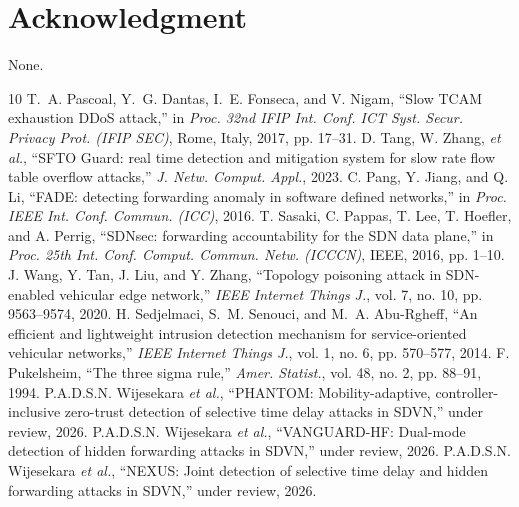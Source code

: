 \documentclass[lettersize,journal]{IEEEtran}
\begin{document}
\section*{Acknowledgment}
None.

\balance
\begin{thebibliography}{10}
\footnotesize
\setlength{\itemsep}{0pt}
\setlength{\parsep}{0pt}
\setlength{\parskip}{0pt}
 T.~A. Pascoal, Y.~G. Dantas, I.~E. Fonseca, and V. Nigam, ``Slow TCAM exhaustion DDoS attack,'' in \textit{Proc. 32nd IFIP Int. Conf. ICT Syst. Secur. Privacy Prot. (IFIP SEC)}, Rome, Italy, 2017, pp. 17--31.
 D. Tang, W. Zhang, \textit{et al.}, ``SFTO Guard: real time detection and mitigation system for slow rate flow table overflow attacks,'' \textit{J. Netw. Comput. Appl.}, 2023.
 C. Pang, Y. Jiang, and Q. Li, ``FADE: detecting forwarding anomaly in software defined networks,'' in \textit{Proc. IEEE Int. Conf. Commun. (ICC)}, 2016.
 T. Sasaki, C. Pappas, T. Lee, T. Hoefler, and A. Perrig, ``SDNsec: forwarding accountability for the SDN data plane,'' in \textit{Proc. 25th Int. Conf. Comput. Commun. Netw. (ICCCN)}, IEEE, 2016, pp. 1--10.
 J. Wang, Y. Tan, J. Liu, and Y. Zhang, ``Topology poisoning attack in SDN-enabled vehicular edge network,'' \textit{IEEE Internet Things J.}, vol. 7, no. 10, pp. 9563--9574, 2020.
 H. Sedjelmaci, S.~M. Senouci, and M.~A. Abu-Rgheff, ``An efficient and lightweight intrusion detection mechanism for service-oriented vehicular networks,'' \textit{IEEE Internet Things J.}, vol. 1, no. 6, pp. 570--577, 2014.
 F. Pukelsheim, ``The three sigma rule,'' \textit{Amer. Statist.}, vol. 48, no. 2, pp. 88--91, 1994.
 P.A.D.S.N. Wijesekara \textit{et al.}, ``PHANTOM: Mobility-adaptive, controller-inclusive zero-trust detection of selective time delay attacks in SDVN,'' under review, 2026.
 P.A.D.S.N. Wijesekara \textit{et al.}, ``VANGUARD-HF: Dual-mode detection of hidden forwarding attacks in SDVN,'' under review, 2026.
 P.A.D.S.N. Wijesekara \textit{et al.}, ``NEXUS: Joint detection of selective time delay and hidden forwarding attacks in SDVN,'' under review, 2026.
\end{thebibliography}
\end{document}
